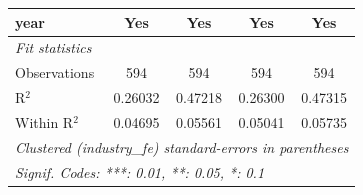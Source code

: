 \begin{tabular}{lcccc}
   year                                                          & Yes                       & Yes                             & Yes                       & Yes\\  
   \midrule
   \emph{Fit statistics}\\
   Observations                                                  & 594                       & 594                             & 594                       & 594\\  
   R$^2$                                                         & 0.26032                   & 0.47218                         & 0.26300                   & 0.47315\\  
   Within R$^2$                                                  & 0.04695                   & 0.05561                         & 0.05041                   & 0.05735\\  
   \midrule \midrule
   \multicolumn{5}{l}{\emph{Clustered (industry\_fe) standard-errors in parentheses}}\\
   \multicolumn{5}{l}{\emph{Signif. Codes: ***: 0.01, **: 0.05, *: 0.1}}\\
\end{tabular}
\par\endgroup

